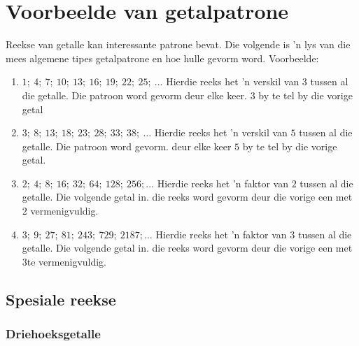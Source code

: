 \section{Voorbeelde van getalpatrone}
Reekse van getalle kan interessante patrone bevat. Die volgende is ’n lys van die mees algemene tipes getalpatrone en
hoe hulle gevorm word.
Voorbeelde:
\begin{enumerate}[noitemsep, label=\textbf{\arabic*}. ] 
    \item $1;~4;~7;~10;~13;~16;~19;~22;~25;~\ldots$
    Hierdie reeks het ’n verskil van $3$ tussen al die getalle. Die patroon word gevorm deur elke keer.
     $3$ by te tel by die vorige getal
    \item $3;~8;~13;~18;~23;~28;~33;~38;~\ldots$
     Hierdie reeks het ’n verskil van $5$ tussen al die getalle. Die patroon word gevorm.
    deur elke keer $5$ by te tel by die vorige getal.
    \item $2;~4;~8;~16;~32;~64;~128;~256;\ldots$
    Hierdie reeks het ’n faktor van $2$ tussen al die getalle. Die volgende getal in.
    die reeks word gevorm deur die vorige een met $2$ vermenigvuldig.
    \item $3;~9;~27;~81;~243;~729;~2187;\ldots$
    Hierdie reeks het ’n faktor van $3$ tussen al die getalle. Die volgende getal in.
    die reeks word gevorm deur die vorige een met  $3$te vermenigvuldig.
\end{enumerate}
     

\subsection*{Spesiale reekse}

\subsubsection*{Driehoeksgetalle}

